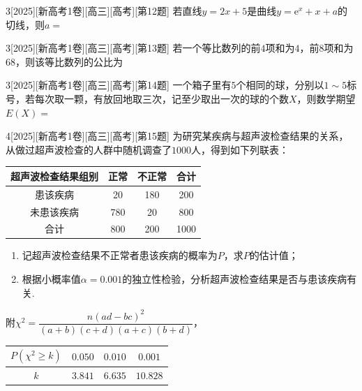 \begin{example}{3}[2025][新高考1卷][高三][高考][第12题]
若直线$y=2x+5$是曲线$y=\text{e}^x+x+a$的切线，则$a=$\blankline
{}
\end{example}

\begin{example}{3}[2025][新高考1卷][高三][高考][第13题]
若一个等比数列的前$4$项和为$4$，前$8$项和为$68$，则该等比数列的公比为\blankline
{}
\end{example}

\begin{example}{3}[2025][新高考1卷][高三][高考][第14题]
一个箱子里有$5$个相同的球，分别以$1\sim5$标号，若每次取一颗，有放回地取三次，记至少取出一次的球的个数$X$，则数学期望$E(X)=$\blankline
{}
\end{example}

\begin{example}{4}[2025][新高考1卷][高三][高考][第15题]
为研究某疾病与超声波检查结果的关系，从做过超声波检查的人群中随机调查了$1000$人，得到如下列联表：
\begin{center}
\begin{tabular}{|c|c|c|c|}
\hline
超声波检查结果组别 & 正常 & 不正常 & 合计 \\
\hline
患该疾病 & 20 & 180 & 200 \\
\hline
未患该疾病 & 780 & 20 & 800 \\
\hline
合计 & 800 & 200 & 1000 \\
\hline
\end{tabular}
\end{center}
\begin{enumerate}
    \item 记超声波检查结果不正常者患该疾病的概率为$P$，求$P$的估计值；
    \item 根据小概率值$\alpha=0.001$的独立性检验，分析超声波检查结果是否与患该疾病有关.
\end{enumerate}
附$\chi^2=\dfrac{n(ad-bc)^2}{(a+b)(c+d)(a+c)(b+d)}$，
\begin{center}
\begin{tabular}{|c|c|c|c|}
\hline
$P(\chi^2\ge k)$ & $0.050$ & $0.010$ & $0.001$ \\
\hline
$k$ & $3.841$ & $6.635$ & $10.828$ \\
\hline
\end{tabular}
\end{center}
\end{example}


